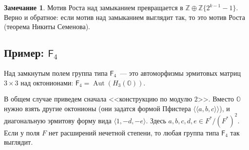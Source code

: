 \documentclass[a4paper]{article}
\DeclareMathOperator{\Aut}{Aut}
\theoremstyle{definition}
\newtheorem{remark}[theorem]{Замечание}
\newcommand{\la}{\langle}
\newcommand{\ra}{\rangle}
\newcommand{\lAngle}{\langle\!\langle}
\newcommand{\rAngle}{\rangle\!\rangle}
\begin{document}
\begin{remark}
Мотив Роста над замыканием превращается в
$\mathbb{Z} \oplus \mathbb{Z}\{2^{k-1}-1\}$.
Верно и обратное:
если мотив над замыканием выглядит так, то это мотив Роста
(теорема Никиты Семенова).
\end{remark}


\subsection{Пример: $\mathsf{F}_4$}

Над замкнутым полем группа типа $\mathsf{F}_4$~--- это автоморфизмы
эрмитовых матриц $3\times 3$ над октонионами:
$\mathsf{F}_4 = \Aut(H_3(\mathbb{O}))$.

В общем случае приведем сначала <<конструкцию по модулю $2$>>.
Вместо $\mathbb{O}$ нужно взять другие октонионы
(они задатся формой Пфистера $\lAngle a,b,c\rAngle$),
и диагональную эрмитову форму вида $\la 1, -d, -e\ra$.
Здесь $a,b,c,d,e\in F^* / (F^*)^2$.
Если у поля $F$ нет расширений нечетной степени, то любая группа
типа $\mathsf{F}_4$ так выглядит.
\end{document}
